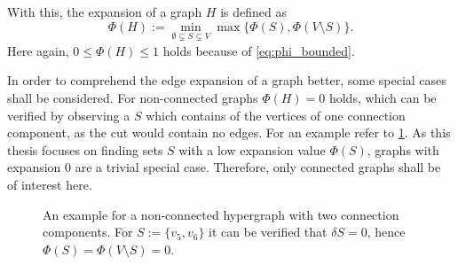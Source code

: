 With this, the expansion of a graph $H$ is defined as \begin{equation}
\Phi(H) := \min_{\emptyset \subsetneq S \subsetneq V} \max \{\Phi(S), \Phi(V\setminus S)\}.
\end{equation} Here again, $0\le \Phi(H)\le 1$ holds because of \cref{eq:phi_bounded}.

In order to comprehend the edge expansion of a graph better, some special cases shall be considered.
For non-connected graphs $\Phi(H) = 0$ holds, which can be verified by observing a $S$ which contains of the vertices of one connection component, as the cut would contain no edges. For an example refer to \cref{fig:exapmle_non_connected_hypergraph}. 
As this thesis focuses on finding sets $S$ with a low expansion value $\Phi(S)$, graphs with expansion $0$ are a trivial special case. Therefore, only connected graphs shall be of interest here.

\begin{figure} [htpb]
	\centering
	\caption[Example non-connected hypergraph]{An example for a non-connected hypergraph with two connection components. For $S:= \{v_5, v_6\} $ it can be verified that $\delta S = 0$, hence $\Phi(S) =\Phi(V\setminus S) = 0$. }\label{fig:exapmle_non_connected_hypergraph}
\end{figure}

